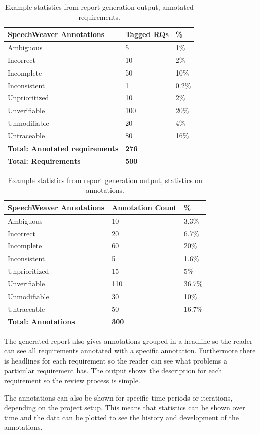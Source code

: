 \begin{table}[h]
\centering
\caption{Example statistics from report generation output, annotated requirements.}
    \begin{tabular}{ l l l}
        \hline
        SpeechWeaver Annotations & Tagged RQs & \% \\
        \hline
        Ambiguous & 5 & 1\% \\ 
        Incorrect & 10 & 2\%  \\ 
        Incomplete & 50 & 10\%  \\ 
        Inconsistent & 1 & 0.2\%  \\
        Unprioritized & 10 & 2\%  \\
        Unverifiable & 100 & 20\%  \\
        Unmodifiable & 20 & 4\%  \\
        Untraceable & 80 & 16\%  \\ \hline
        \textbf{Total: Annotated requirements} & \textbf{276} & \\
        \textbf{Total: Requirements} & \textbf{500} & \\
        \end{tabular}     
\label{tab:repgenstat1}
\end{table}

\begin{table}[h]
\centering
\caption{Example statistics from report generation output, statistics on annotations.}
    \begin{tabular}{ l l l}
        \hline
        SpeechWeaver Annotations & Annotation Count & \% \\
        \hline
        Ambiguous & 10 & 3.3\% \\ 
        Incorrect & 20 & 6.7\%  \\ 
        Incomplete & 60 & 20\%  \\ 
        Inconsistent & 5 & 1.6\%  \\
        Unprioritized & 15 & 5\%  \\
        Unverifiable & 110 & 36.7\%  \\
        Unmodifiable & 30 & 10\%  \\
        Untraceable & 50 & 16.7\%  \\ \hline
        \textbf{Total: Annotations} & \textbf{300} & \\
        \end{tabular} 
\label{tab:repgenstat2}
\end{table}

The generated report also gives annotations grouped in a headline so the reader can see all requirements annotated with a specific annotation. Furthermore there is headlines for each requirement so the reader can see what problems a particular requirement has. The output shows the description for each requirement so the review process is simple. 

The annotations can also be shown for specific time periods or iterations, depending on the project setup. This means that statistics can be shown over time and the data can be plotted to see the history and development of the annotations.
















